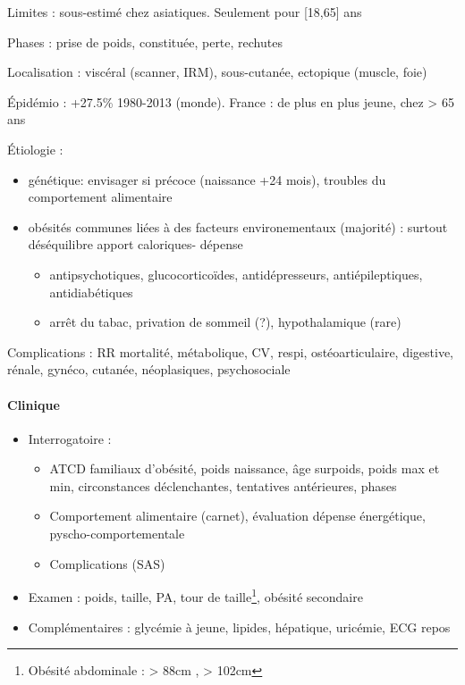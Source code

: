 \documentclass[11pt]{article}
\begin{document}
Limites : sous-estimé chez asiatiques. Seulement pour [18,65] ans

Phases : prise de poids, constituée, perte, rechutes

Localisation : viscéral (scanner, IRM), sous-cutanée, ectopique (muscle, foie)

Épidémio : +27.5\% 1980-2013 (monde). France : de plus en plus jeune, \inc chez >
65 ans

Étiologie :
\begin{itemize}
\item génétique: envisager si précoce (naissance +24 mois), troubles du
comportement alimentaire
\item obésités communes liées à des facteurs environementaux (majorité) : surtout
déséquilibre apport caloriques- dépense
\begin{itemize}
\item antipsychotiques, glucocorticoïdes, antidépresseurs,
antiépileptiques, antidiabétiques
\item arrêt du tabac, privation de sommeil (?), hypothalamique (rare)
\end{itemize}
\end{itemize}

Complications : \inc RR mortalité, métabolique, CV, respi, ostéoarticulaire,
digestive, rénale, gynéco, cutanée, néoplasiques, psychosociale

\paragraph{Clinique}
\label{sec:orgd5c0f81}
\begin{itemize}
\item Interrogatoire : 
\begin{itemize}
\item ATCD familiaux d'obésité, poids naissance, âge surpoids,
poids max et min, circonstances déclenchantes, tentatives antérieures, phases
\item Comportement alimentaire (carnet), évaluation dépense énergétique, pyscho-comportementale
\item Complications (SAS)
\end{itemize}
\item Examen : poids, taille, PA, tour de taille\footnote{Obésité abdominale : > 88cm \female, > 102cm \male}, obésité secondaire
\item Complémentaires : glycémie à jeune, lipides, hépatique, uricémie, ECG repos
\end{itemize}
\end{document}
